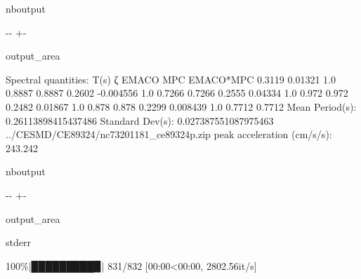 \documentclass[letterpaper,10pt,english]{sphinxmanual}
\begin{document}
\begin{sphinxuseclass}{nboutput}
{

\kern-\sphinxverbatimsmallskipamount\kern-\baselineskip
\kern+\FrameHeightAdjust\kern-\fboxrule
\vspace{\nbsphinxcodecellspacing}

\begin{sphinxuseclass}{output_area}
\begin{sphinxuseclass}{}


\begin{sphinxVerbatim}[commandchars=\\\{\}]
Spectral quantities:
       T(s)        ζ        EMACO        MPC     EMACO*MPC
      0.3119     0.01321    1.0        0.8887     0.8887
      0.2602     -0.004556  1.0        0.7266     0.7266
      0.2555     0.04334    1.0        0.972      0.972
      0.2482     0.01867    1.0        0.878      0.878
      0.2299     0.008439   1.0        0.7712     0.7712
Mean Period(s): 0.26113898415437486
Standard Dev(s): 0.027387551087975463
../CESMD/CE89324/nc73201181\_ce89324p.zip
peak acceleration (cm/s/s): 243.242
\end{sphinxVerbatim}



\end{sphinxuseclass}
\end{sphinxuseclass}
}

\end{sphinxuseclass}
\begin{sphinxuseclass}{nboutput}
{

\kern-\sphinxverbatimsmallskipamount\kern-\baselineskip
\kern+\FrameHeightAdjust\kern-\fboxrule
\vspace{\nbsphinxcodecellspacing}

\begin{sphinxuseclass}{output_area}
\begin{sphinxuseclass}{stderr}


\begin{sphinxVerbatim}[commandchars=\\\{\}]
100\%|█████████▉| 831/832 [00:00<00:00, 2802.56it/s]
\end{sphinxVerbatim}



\end{sphinxuseclass}
\end{sphinxuseclass}
}

\end{sphinxuseclass}
\end{document}

